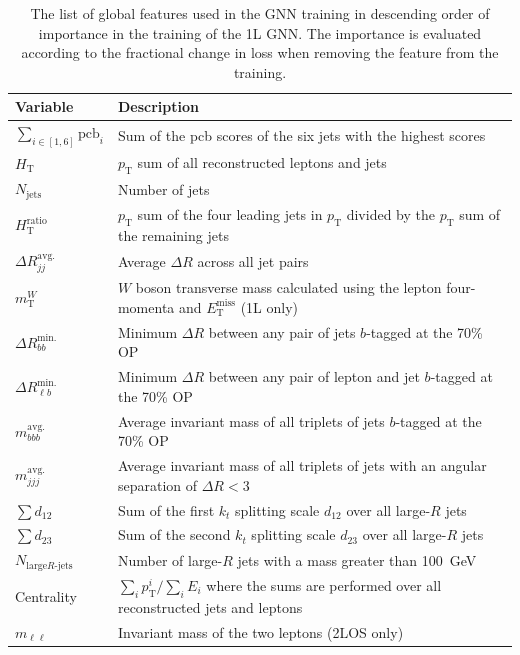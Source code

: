 \begin{table}[t!]
  \centering
  \begin{center}
    \renewcommand{\arraystretch}{1.2}
    \begin{tabular}{ll}
      \toprule \midrule
      Variable                      &    Description \\
      \midrule
      $\sum_{i\in[1,6]}\mathrm{pcb}_i$    & Sum of the pcb scores of the six jets with the highest scores \\
      $H_{\mathrm{T}}$              & $p_{\mathrm{T}}$ sum of all reconstructed leptons and jets \\
      $N_{\mathrm{jets}}$           & Number of jets \\
      $H_{\mathrm{T}}^\mathrm{ratio}$          & $p_{\mathrm{T}}$ sum of the four leading jets in $p_{\mathrm{T}}$ divided by the $p_{\mathrm{T}}$ sum of the remaining jets \\
      $\Delta R_{jj}^\mathrm{avg.}$       & Average $\Delta R$ across all jet pairs \\
      $m_\mathrm{T}^W$              & $W$ boson transverse mass calculated using the lepton four-momenta and $E_{\mathrm{T}}^{\mathrm{miss}}$ (1L only) \\
      $\Delta R_{bb}^\mathrm{min.}$      & Minimum $\Delta R$ between any pair of jets $b$-tagged at the 70\% OP \\
      $\Delta R_{\ell b}^\mathrm{min.}$  & Minimum $\Delta R$ between any pair of lepton and jet $b$-tagged at the 70\% OP \\
      $m_{bbb}^\mathrm{avg.}$       & Average invariant mass of all triplets of jets $b$-tagged at the 70\% OP \\
      $m_{jjj}^\mathrm{avg.}$       & Average invariant mass of all triplets of jets with an angular separation of $\Delta R<3$ \\
      $\sum d_{12}$                 & Sum of the first $k_t$ splitting scale $d_{12}$ over all large-$R$ jets \\
      $\sum d_{23}$                 & Sum of the second $k_t$ splitting scale $d_{23}$ over all large-$R$ jets \\
      $N_{\mathrm{large}R\text{-jets}}$ & Number of large-$R$ jets with a mass greater than 100~GeV \\
      Centrality                    & $\sum_i p_{\mathrm{T}}^i/\sum_i E_i$ where the sums are performed over all reconstructed jets and leptons \\
      $m_{\ell\ell}$                & Invariant mass of the two leptons (2LOS only) \\
      \midrule \bottomrule
    \end{tabular}
    \caption{
      The list of global features used in the GNN training
      in descending order of importance in the training of the 1L GNN\@.
      The importance is evaluated according to the fractional change in loss when removing the feature from the training.
    }
    \label{tab:gnn_global_input}
  \end{center}
\end{table}

